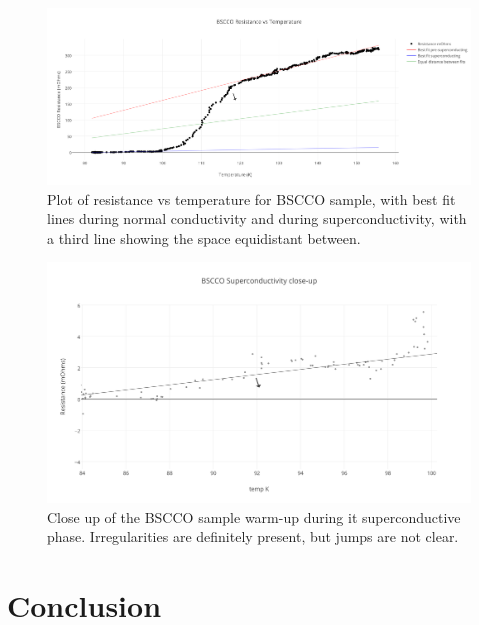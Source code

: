 \documentclass[prb,preprint]{revtex4-1}
\begin{document}
\begin{figure}[h!]
\centering
\includegraphics[width=7in]{bscco_resistance_vs_temperature.png}
\caption{Plot of resistance vs temperature for BSCCO sample, with best fit lines during normal conductivity and during superconductivity, with a third line showing the space equidistant between.}
\label{BSCCOplot1}
\end{figure}

\begin{figure}[h!]
\centering
\includegraphics[width=7in]{bscco_superconductivity_close-up.png}
\caption{Close up of the BSCCO sample warm-up during it superconductive phase. Irregularities are definitely present, but jumps are not clear.}
\label{BSCCOplot2}
\end{figure}

\section{Conclusion}
\end{document}
